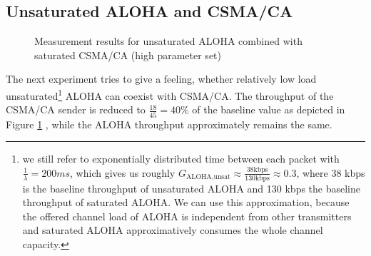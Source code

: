 \clearpage

\subsection{Unsaturated ALOHA and CSMA/CA}
\label{unsat-aloha-csma}

\begin{figure}[tb]
	\label{fig:results-unsat-aloha-csma-2}
	\begin{center}
		\centerline{
		}	
	\end{center}
	\caption{Measurement results for unsaturated ALOHA combined with saturated CSMA/CA (high parameter set)}
\end{figure}

The next experiment tries to give a feeling, whether relatively low load unsaturated\footnote{we still refer to exponentially distributed time between each packet with $\frac{1}{\lambda}=200ms$, which gives us roughly $G_\text{ALOHA,unsat} \approx \frac{38 \text{kbps}}{130 \text{kbps}}\approx 0.3$, where 38 kbps is the baseline throughput of unsaturated ALOHA and 130 kbps the baseline throughput of saturated ALOHA. We can use this approximation, because the offered channel load of ALOHA is independent from other transmitters and saturated ALOHA approximatively consumes the whole channel capacity.} ALOHA can coexist with CSMA/CA. The throughput of the CSMA/CA sender is reduced to $\frac{18}{45}=40\%$ of the baseline value as depicted in Figure \ref{fig:results-unsat-aloha-csma-2} , while the ALOHA throughput approximately remains the same.

